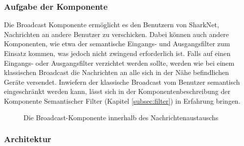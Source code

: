 \subsubsection{Aufgabe der Komponente}
Die Broadcast Komponente ermöglicht es den Benutzern von SharkNet, Nachrichten an andere Benutzer zu verschicken. Dabei können auch andere Komponenten, wie etwa der semantische Eingangs- und Ausgangsfilter zum Einsatz kommen, was jedoch nicht zwingend erforderlich ist. Falls auf einen Eingangs- oder Ausgangsfilter verzichtet werden sollte, werden wie bei einem klassischen Broadcast die Nachrichten an alle sich in der Nähe befindlichen Geräte versendet. Inwiefern der klassische Broadcast vom Benutzer semantisch eingeschränkt werden kann, lässt sich in der Komponentenbeschreibung der Komponente Semantischer Filter (Kapitel \ref{subsec:filter}) in Erfahrung bringen.\newline
\begin{figure}[H]
	\centering
	\caption{Die Broadcast-Komponente innerhalb des Nachrichtenaustauschs}
	\label{fig:broadcastComp}
\end{figure}
\newpage
\subsubsection{Architektur}

